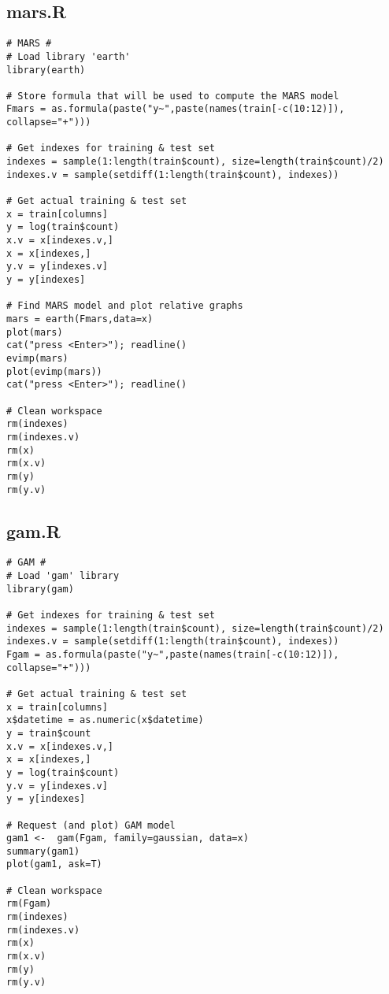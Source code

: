 \subsection{mars.R}\label{sec:mars-script}
\begin{verbatim}
# MARS #
# Load library 'earth'
library(earth)

# Store formula that will be used to compute the MARS model
Fmars = as.formula(paste("y~",paste(names(train[-c(10:12)]), collapse="+")))

# Get indexes for training & test set
indexes = sample(1:length(train$count), size=length(train$count)/2)
indexes.v = sample(setdiff(1:length(train$count), indexes))

# Get actual training & test set
x = train[columns]
y = log(train$count)
x.v = x[indexes.v,]
x = x[indexes,]
y.v = y[indexes.v]
y = y[indexes]

# Find MARS model and plot relative graphs
mars = earth(Fmars,data=x)
plot(mars)
cat("press <Enter>"); readline()
evimp(mars)
plot(evimp(mars))
cat("press <Enter>"); readline()

# Clean workspace
rm(indexes)
rm(indexes.v)
rm(x)
rm(x.v)
rm(y)
rm(y.v)
\end{verbatim}

\subsection{gam.R}\label{sec:gam-script}
\begin{verbatim}
# GAM #
# Load 'gam' library
library(gam)

# Get indexes for training & test set
indexes = sample(1:length(train$count), size=length(train$count)/2)
indexes.v = sample(setdiff(1:length(train$count), indexes))
Fgam = as.formula(paste("y~",paste(names(train[-c(10:12)]), collapse="+")))

# Get actual training & test set
x = train[columns]
x$datetime = as.numeric(x$datetime)
y = train$count
x.v = x[indexes.v,]
x = x[indexes,]
y = log(train$count)
y.v = y[indexes.v]
y = y[indexes]

# Request (and plot) GAM model
gam1 <-  gam(Fgam, family=gaussian, data=x)
summary(gam1)
plot(gam1, ask=T)

# Clean workspace
rm(Fgam)
rm(indexes)
rm(indexes.v)
rm(x)
rm(x.v)
rm(y)
rm(y.v)
\end{verbatim}

